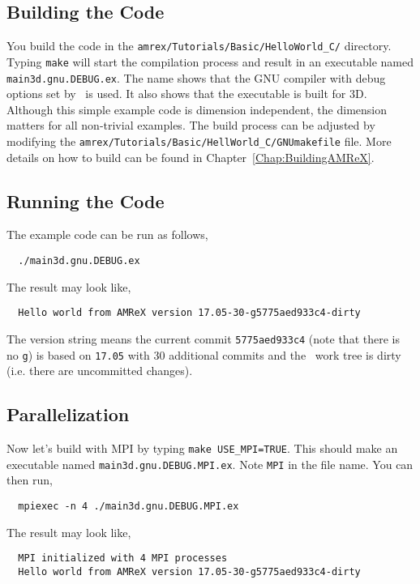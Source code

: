 \subsection{Building the Code}

You build the code in the {\tt amrex/Tutorials/Basic/HelloWorld\_C/}
directory.  Typing {\tt make} will start the compilation process and
result in an executable named {\tt main3d.gnu.DEBUG.ex}.  The name
shows that the GNU compiler with debug options set by \amrex\ is used.
It also shows that the executable is built for 3D.  Although this
simple example code is dimension independent, the dimension matters
for all non-trivial examples.  The build process can be adjusted by
modifying the {\tt amrex/Tutorials/Basic/HellWorld\_C/GNUmakefile} file.
More details on how to build \amrex can be found in
Chapter~\ref{Chap:BuildingAMReX}.

\subsection{Running the Code}

The example code can be run as follows,
\begin{verbatim}
  ./main3d.gnu.DEBUG.ex
\end{verbatim}
The result may look like,
\begin{verbatim}
  Hello world from AMReX version 17.05-30-g5775aed933c4-dirty
\end{verbatim}
The version string means the current commit {\tt 5775aed933c4} (note
that there is no {\tt g}) is based on {\tt 17.05} with 30 additional
commits and the \amrex\ work tree is dirty (i.e. there are uncommitted
changes).

\subsection{Parallelization}

Now let's build with MPI by typing {\tt make USE\_MPI=TRUE}.  This
should make an executable named {\tt main3d.gnu.DEBUG.MPI.ex}.  Note
{\tt MPI} in the file name.  You can then run,
\begin{verbatim}
  mpiexec -n 4 ./main3d.gnu.DEBUG.MPI.ex
\end{verbatim}
The result may look like,
\begin{verbatim}
  MPI initialized with 4 MPI processes
  Hello world from AMReX version 17.05-30-g5775aed933c4-dirty
\end{verbatim}

